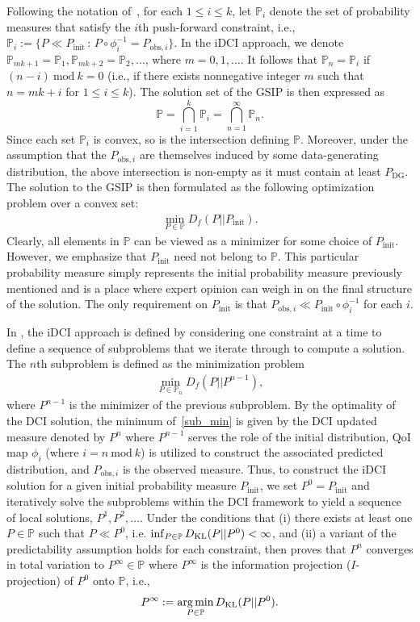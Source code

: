\documentclass{article}
\newcommand{\p}{\mathbb{P}}
\newcommand{\initmeas}{P_{\text{init}}}
\newcommand{\obsmeasi}{P_{\text{obs}, i}}
\DeclareMathOperator*{\argmin}{arg\,min}
\begin{document}
Following the notation of~\cite{JBW+26}, for each $1\leq i\leq k$, let $\p_{i}$ denote the set of probability measures that satisfy the $i$th push-forward constraint, i.e., $\p_{i} := \{P\ll \initmeas\, :\,  P\circ\phi_{i}^{-1} = P_{\text{obs},i}\}$.
In the iDCI approach, we denote $\p_{mk+1}=\p_1, \p_{mk+2}=\p_2, \ldots$, where $m=0, 1, \ldots$.
It follows that $\p_n=\p_i$ if $(n-i) \mathrm{~mod~} k =0$ (i.e., if there exists nonnegative integer $m$ such that $n=mk+i$ for $1\leq i\leq k$).
The solution set of the GSIP is then expressed as
\begin{equation*}
    \p = \bigcap_{i = 1}^k \p_{i} = \bigcap_{n = 1}^\infty \p_{n}.
\end{equation*}
Since each set $\p_i$ is convex, so is the intersection defining $\p$.
Moreover, under the assumption that the $P_{\text{obs},i}$ are themselves induced by some data-generating distribution, the above intersection is non-empty as it must contain at least $P_\text{DG}$.
The solution to the GSIP is then formulated as the following optimization problem over a convex set:
\begin{align} \label{overall_min}
    \min_{P \in \p}D_f(P|| P_\text{init}).
\end{align}
Clearly, all elements in $\p$ can be viewed as a minimizer for some choice of $P_\text{init}$.
However, we emphasize that $P_\text{init}$ need not belong to $\p$.
This particular probability measure simply represents the initial probability measure previously mentioned and is a place where expert opinion can weigh in on the final structure of the solution.
The only requirement on $\initmeas$ is that $\obsmeasi \ll \initmeas\circ \phi_i^{-1}$ for each $i$.

In \cite{JBW+26}, the iDCI approach is defined by considering one constraint at a time to define a sequence of subproblems that we iterate through to compute a solution.
The $n$th subproblem is defined as the minimization problem
\begin{align} \label{sub_min}
    \min_{P \in \p_{n}} D_f(P ||P^{n-1}),
\end{align}
where $P^{n-1}$ is the minimizer of the previous subproblem.
By the optimality of the DCI solution, the minimum of~\eqref{sub_min} is given by the DCI updated measure denoted by $P^{n}$ where $P^{n-1}$ serves the role of the initial distribution, QoI map $\phi_i$ (where $i=n \mathrm{~mod~} k$) is utilized to construct the associated predicted distribution, and $\obsmeasi$ is the observed measure.
Thus, to construct the iDCI solution for a given initial probability measure $P_\text{init}$, we set $P^0=P_\text{init}$ and iteratively solve the subproblems within the DCI framework to yield a sequence of local solutions, $P^1, P^2, \ldots$.
Under the conditions that (i) there exists at least one $P \in \p$ such that $P \ll P^{0}$, i.e. $\inf_{P \in \p} D_{\rm KL}(P || P^{0}) < \infty$, and (ii) a variant of the predictability assumption holds for each constraint,
then \cite{JBW+26} proves that $P^{n}$ converges in total variation to $P^{\infty} \in \p$ where $P^{\infty}$ is the information projection ($I$-projection) of $P^{0}$ onto $\p$, i.e.,
\[
P^{\infty} := \argmin_{P \in \p} D_{\rm KL}(P || P^{0}).
\]
\end{document}
